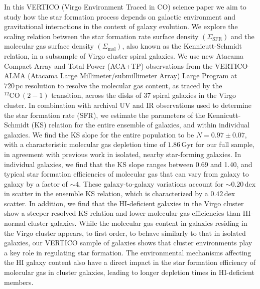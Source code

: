 \documentclass[longauth]{aa}
\begin{document}
 \abstract
   {}
   {In this VERTICO (Virgo Environment Traced in CO) science paper we aim to study how the star formation process depends on galactic environment and gravitational interactions in the context of galaxy evolution. We explore the scaling relation between the star formation rate surface density $(\Sigma_\mathrm{SFR})$ and the molecular gas surface density $(\Sigma_\mathrm{mol})$, also known as the Kennicutt-Schmidt relation, in a subsample of Virgo cluster spiral galaxies.}
   {We use new Atacama Compact Array and Total Power (ACA+TP) observations from the VERTICO-ALMA (Atacama Large Millimeter/submillimeter Array) Large Program at $720\,\mathrm{pc}$ resolution to resolve the molecular gas content, as traced by the $^{12}\mathrm{CO}\,(2-1)$ transition, across the disks of 37 spiral galaxies in the Virgo cluster. In combination with archival UV and IR observations used to determine the star formation rate (SFR), we estimate the parameters of the Kennicutt-Schmidt (KS) relation for the entire ensemble of galaxies, and within individual galaxies.}
   {We find the KS slope for the entire population to be $N=0.97\pm0.07$, with a characteristic molecular gas depletion time of $1.86\,\mathrm{Gyr}$ for our full sample, in agreement with previous work in isolated, nearby star-forming galaxies. In individual galaxies, we find that the KS slope ranges between 0.69 and 1.40, and typical star formation efficiencies of molecular gas that can vary from galaxy to galaxy by a factor of $\sim 4$. These galaxy-to-galaxy variations account for $\sim 0.20\,\mathrm{dex}$ in scatter in the ensemble KS relation, which is characterized by a $0.42\,\mathrm{dex}$ scatter. In addition, we find that the HI-deficient galaxies in the Virgo cluster show a steeper resolved KS relation and lower molecular gas efficiencies than HI-normal cluster galaxies.}
   {While the molecular gas content in galaxies residing in the Virgo cluster appears, to first order, to behave similarly to that in isolated galaxies, our VERTICO sample of galaxies shows that cluster environments play a key role in regulating star formation. The environmental mechanisms affecting the HI galaxy content also have a direct impact in the star formation efficiency of molecular gas in cluster galaxies, leading to longer depletion times in HI-deficient members.}
\end{document}
